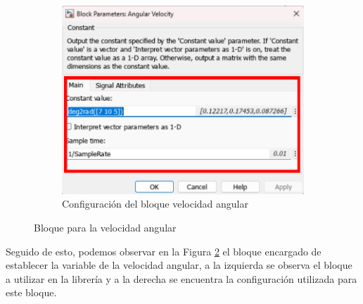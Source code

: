 \begin{figure}[htbp]
\begin{subfigure}[b]{0.45\textwidth}
        \includegraphics[width=\textwidth]{fig/Capitulo5/Caso_de_estudio_IMU/Generador_de_archivos/configuracion_bloque_velocidad_angular.pdf}
        \caption{Configuración del bloque velocidad angular}
        \label{fig:lib_bloques_config_angular_velocity}
    \end{subfigure}
    \caption{Bloque para la velocidad angular}
    \label{fig:angular_velocity_block_simulink}
\end{figure}

Seguido de esto, podemos observar en la Figura \ref{fig:angular_velocity_block_simulink} el bloque encargado de establecer la variable de la velocidad angular, a la izquierda se observa el bloque a utilizar en la librería y a la derecha se encuentra la configuración utilizada para este bloque. 

